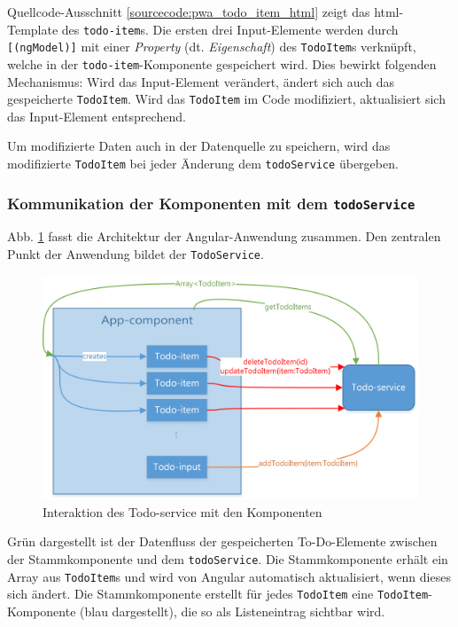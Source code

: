 \begin{description}
	Quellcode-Ausschnitt \ref{sourcecode:pwa_todo_item_html} zeigt das \ac{html}-Template des \texttt{todo-item}s. Die ersten drei Input-Elemente werden durch \texttt{[(ngModel)]} mit einer \textit{Property} (dt. \textit{Eigenschaft}) des \texttt{TodoItem}s verknüpft, welche in der \texttt{todo-item}-Komponente gespeichert wird. Dies bewirkt folgenden Mechanismus: Wird das Input-Element verändert, ändert sich auch das gespeicherte \texttt{TodoItem}. Wird das \texttt{TodoItem} im Code modifiziert, aktualisiert sich das Input-Element entsprechend.
	
	Um modifizierte Daten auch in der Datenquelle zu speichern, wird das modifizierte \texttt{TodoItem} bei jeder Änderung dem \texttt{todoService} übergeben.
	
\end{description}

\subsubsection{Kommunikation der Komponenten mit dem \texttt{todoService}}

Abb. \ref{fig:pwa_todo_service} fasst die Architektur der Angular-Anwendung zusammen. Den zentralen Punkt der Anwendung bildet der \texttt{TodoService}. \newpage
\begin{figure}[h!]
	\includegraphics[width=\textwidth]{img/pwa_components.png}
	\centering
	\caption{Interaktion des Todo-service mit den Komponenten}
	\label{fig:pwa_todo_service}
\end{figure}



Grün dargestellt ist der Datenfluss der gespeicherten To-Do-Elemente zwischen der Stammkomponente und dem \texttt{todoService}. Die Stammkomponente erhält ein Array aus \texttt{TodoItem}s und wird von Angular automatisch aktualisiert, wenn dieses sich ändert.
Die Stammkomponente erstellt für jedes \texttt{TodoItem} eine \texttt{TodoItem}-Komponente (blau dargestellt), die so als Listeneintrag sichtbar wird.

